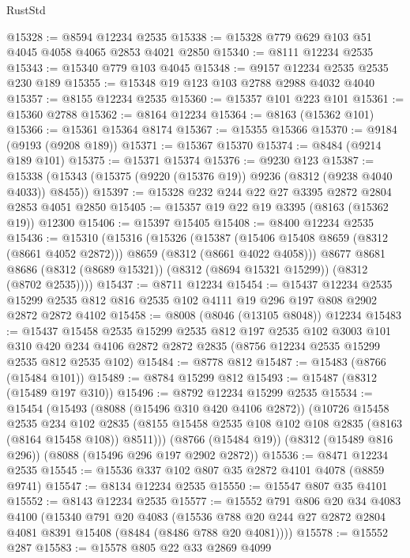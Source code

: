 \begin{lexlean}{RustStd}
\begin{coremodule}
@15328 := @8594 @12234 @2535
@15338 := @15328 @779 @629 @103 @51 @4045 @4058 @4065 @2853 @4021 @2850
@15340 := @8111 @12234 @2535
@15343 := @15340 @779 @103 @4045
@15348 := @9157 @12234 @2535 @2535 @230 @189
@15355 := @15348 @19 @123 @103 @2788 @2988 @4032 @4040
@15357 := @8155 @12234 @2535
@15360 := @15357 @101 @223 @101
@15361 := @15360 @2788
@15362 := @8164 @12234
@15364 := @8163 (@15362 @101)
@15366 := @15361 @15364 @8174
@15367 := @15355 @15366
@15370 := @9184 (@9193 (@9208 @189))
@15371 := @15367 @15370
@15374 := @8484 (@9214 @189 @101)
@15375 := @15371 @15374
@15376 := @9230 @123
@15387 := @15338 (@15343 (@15375 (@9220 (@15376 @19)) @9236 (@8312 (@9238 @4040 @4033)) @8455))
@15397 := @15328 @232 @244 @22 @27 @3395 @2872 @2804 @2853 @4051 @2850
@15405 := @15357 @19 @22 @19 @3395 (@8163 (@15362 @19)) @12300
@15406 := @15397 @15405
@15408 := @8400 @12234 @2535
@15436 := @15310
    (@15316
      (@15326
        (@15387 (@15406 @15408 @8659 (@8312 (@8661 @4052 @2872))) @8659 (@8312 (@8661 @4022 @4058)))
        @8677
        @8681
        @8686
        (@8312 (@8689 @15321))
        (@8312 (@8694 @15321 @15299))
        (@8312 (@8702 @2535))))
@15437 := @8711 @12234
@15454 := @15437
    @12234
    @2535
    @15299
    @2535
    @812
    @816
    @2535
    @102
    @4111
    @19
    @296
    @197
    @808
    @2902
    @2872
    @2872
    @4102
@15458 := @8008 (@8046 (@13105 @8048)) @12234
@15483 := @15437
    @15458
    @2535
    @15299
    @2535
    @812
    @197
    @2535
    @102
    @3003
    @101
    @310
    @420
    @234
    @4106
    @2872
    @2872
    @2835
    (@8756 @12234 @2535 @15299 @2535 @812 @2535 @102)
@15484 := @8778 @812
@15487 := @15483 (@8766 (@15484 @101))
@15489 := @8784 @15299 @812
@15493 := @15487 (@8312 (@15489 @197 @310))
@15496 := @8792 @12234 @15299 @2535
@15534 := @15454
    (@15493
      (@8088 (@15496 @310 @420 @4106 @2872))
      (@10726
        @15458
        @2535
        @234
        @102
        @2835
        (@8155 @15458 @2535 @108 @102 @108 @2835 (@8163 (@8164 @15458 @108)) @8511)))
    (@8766 (@15484 @19))
    (@8312 (@15489 @816 @296))
    (@8088 (@15496 @296 @197 @2902 @2872))
@15536 := @8471 @12234 @2535
@15545 := @15536 @337 @102 @807 @35 @2872 @4101 @4078 (@8859 @9741)
@15547 := @8134 @12234 @2535
@15550 := @15547 @807 @35 @4101
@15552 := @8143 @12234 @2535
@15577 := @15552
    @791
    @806
    @20
    @34
    @4083
    @4100
    (@15340
      @791
      @20
      @4083
      (@15536 @788 @20 @244 @27 @2872 @2804 @4081 @8391 @15408 (@8484 (@8486 @788 @20 @4081))))
@15578 := @15552 @287
@15583 := @15578 @805 @22 @33 @2869 @4099

\end{coremodule}
\end{lexlean}
